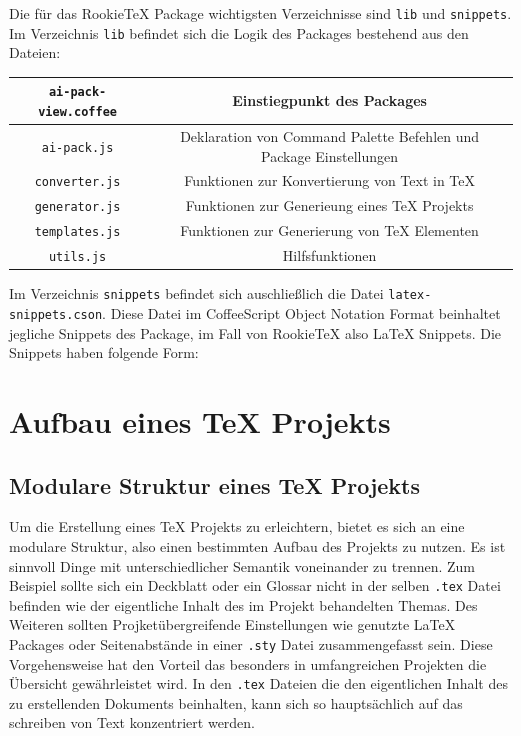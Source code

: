     Die für das RookieTeX Package wichtigsten Verzeichnisse sind \texttt{lib} und \texttt{snippets}. Im Verzeichnis \texttt{lib} befindet sich die Logik des Packages bestehend aus den Dateien:
    \begin{tabular}{ | c | c | }
      \hline
      \texttt{ai-pack-view.coffee} & Einstiegpunkt des Packages \\
      \hline
      \texttt{ai-pack.js} & Deklaration von Command Palette Befehlen und Package Einstellungen \\
      \hline
      \texttt{converter.js} & Funktionen zur Konvertierung von Text in TeX \\
      \hline
      \texttt{generator.js} & Funktionen zur Generieung eines TeX Projekts \\
      \hline
      \texttt{templates.js} & Funktionen zur Generierung von TeX Elementen \\
      \hline
      \texttt{utils.js} & Hilfsfunktionen \\
      \hline
    \end{tabular}

    Im Verzeichnis \texttt{snippets} befindet sich auschließlich die Datei \texttt{latex-snippets.cson}. Diese Datei im CoffeeScript Object Notation Format beinhaltet jegliche Snippets des Package, im Fall von RookieTeX also LaTeX Snippets. Die Snippets haben folgende Form:

\chapter{Aufbau eines TeX Projekts}
    \section{Modulare Struktur eines TeX Projekts}
    Um die Erstellung eines TeX Projekts zu erleichtern, bietet es sich an eine modulare Struktur, also einen bestimmten Aufbau des Projekts zu nutzen. Es ist sinnvoll Dinge mit unterschiedlicher Semantik voneinander zu trennen. Zum Beispiel sollte sich ein Deckblatt oder ein Glossar nicht in der selben \texttt{.tex} Datei befinden wie der eigentliche Inhalt des im Projekt behandelten Themas. Des Weiteren sollten Projketübergreifende Einstellungen wie genutzte LaTeX Packages oder Seitenabstände in einer \texttt{.sty} Datei zusammengefasst sein. Diese Vorgehensweise hat den Vorteil das besonders in umfangreichen Projekten die Übersicht gewährleistet wird. In den \texttt{.tex} Dateien die den eigentlichen Inhalt des zu erstellenden Dokuments beinhalten, kann sich so hauptsächlich auf das schreiben von Text konzentriert werden.

